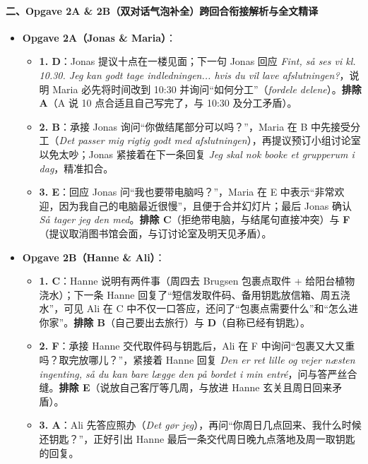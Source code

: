 \paragraph*{二、Opgave 2A \& 2B（双对话气泡补全）跨回合衔接解析与全文精译}
\begin{itemize}
  \item \textbf{Opgave 2A（Jonas \& Maria）}：
    \begin{itemize}
      \item \textbf{1. D}：Jonas 提议十点在一楼见面；下一句 Jonas 回应 \textit{Fint, så ses vi kl. 10.30. Jeg kan godt tage indledningen... hvis du vil lave afslutningen?}，说明 Maria 必先将时间改到 10:30 并询问“如何分工”（\textit{fordele delene}）。\textbf{排除 A}（A 说 10 点合适且自己写完了，与 10:30 及分工矛盾）。
      \item \textbf{2. B}：承接 Jonas 询问“你做结尾部分可以吗？”，Maria 在 B 中先接受分工（\textit{Det passer mig rigtig godt med afslutningen}），再提议预订小组讨论室以免太吵；Jonas 紧接着在下一条回复 \textit{Jeg skal nok booke et grupperum i dag}，精准扣合。
      \item \textbf{3. E}：回应 Jonas 问“我也要带电脑吗？”，Maria 在 E 中表示“非常欢迎，因为我自己的电脑最近很慢”，且便于合并幻灯片；最后 Jonas 确认 \textit{Så tager jeg den med}。\textbf{排除 C}（拒绝带电脑，与结尾句直接冲突）与 \textbf{F}（提议取消图书馆会面，与订讨论室及明天见矛盾）。
    \end{itemize}
  \item \textbf{Opgave 2B（Hanne \& Ali）}：
    \begin{itemize}
      \item \textbf{1. C}：Hanne 说明有两件事（周四去 Brugsen 包裹点取件 + 给阳台植物浇水）；下一条 Hanne 回复了“短信发取件码、备用钥匙放信箱、周五浇水”，可见 Ali 在 C 中不仅一口答应，还问了“包裹点需要什么”和“怎么进你家”。\textbf{排除 B}（自己要出去旅行）与 \textbf{D}（自称已经有钥匙）。
      \item \textbf{2. F}：承接 Hanne 交代取件码与钥匙后，Ali 在 F 中询问“包裹又大又重吗？取完放哪儿？”，紧接着 Hanne 回复 \textit{Den er ret lille og vejer næsten ingenting, så du kan bare lægge den på bordet i min entré}，问与答严丝合缝。\textbf{排除 E}（说放自己客厅等几周，与放进 Hanne 玄关且周日回来矛盾）。
      \item \textbf{3. A}：Ali 先答应照办（\textit{Det gør jeg}），再问“你周日几点回来、我什么时候还钥匙？”，正好引出 Hanne 最后一条交代周日晚九点落地及周一取钥匙的回复。
    \end{itemize}
\end{itemize}

